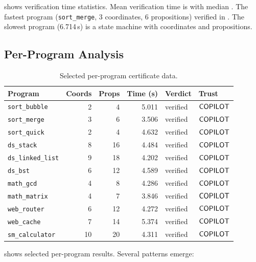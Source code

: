 \documentclass[11pt]{article}
\begin{document}
 shows verification time statistics.
Mean verification time is \expTimeMean{} with median
\expTimeMedian{}.  The fastest program (\texttt{sort\_merge},
3 coordinates, 6 propositions) verified in \expTimeMin{}.
The slowest program (6.714\,s) is a state machine with
\expCoordsMax{} coordinates and \expPropsMax{} propositions.

\subsection{Per-Program Analysis}

\begin{table}[t]
\centering
\caption{Selected per-program certificate data.}
\label{tab:per-program}
\small
\begin{tabular}{@{}lrrrll@{}}
\toprule
\textbf{Program} & \textbf{Coords} & \textbf{Props} &
\textbf{Time (s)} & \textbf{Verdict} & \textbf{Trust} \\
\midrule
\texttt{sort\_bubble} & 2 & 4 & 5.011 & verified & $\mathsf{COPILOT}$ \\
\texttt{sort\_merge} & 3 & 6 & 3.506 & verified & $\mathsf{COPILOT}$ \\
\texttt{sort\_quick} & 2 & 4 & 4.632 & verified & $\mathsf{COPILOT}$ \\
\texttt{ds\_stack} & 8 & 16 & 4.484 & verified & $\mathsf{COPILOT}$ \\
\texttt{ds\_linked\_list} & 9 & 18 & 4.202 & verified & $\mathsf{COPILOT}$ \\
\texttt{ds\_bst} & 6 & 12 & 4.589 & verified & $\mathsf{COPILOT}$ \\
\texttt{math\_gcd} & 4 & 8 & 4.286 & verified & $\mathsf{COPILOT}$ \\
\texttt{math\_matrix} & 4 & 7 & 3.846 & verified & $\mathsf{COPILOT}$ \\
\texttt{web\_router} & 6 & 12 & 4.272 & verified & $\mathsf{COPILOT}$ \\
\texttt{web\_cache} & 7 & 14 & 5.374 & verified & $\mathsf{COPILOT}$ \\
\texttt{sm\_calculator} & 10 & 20 & 4.311 & verified & $\mathsf{COPILOT}$ \\
\bottomrule
\end{tabular}
\end{table}

 shows selected per-program results.
Several patterns emerge:
\end{document}
